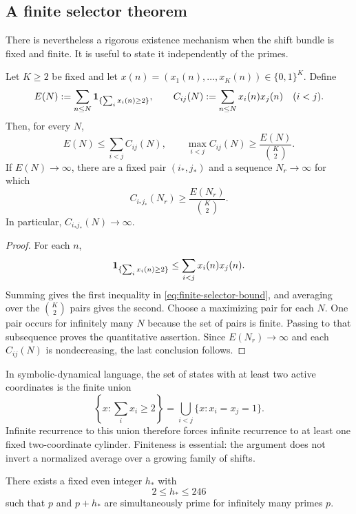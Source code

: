 \subsection{A finite selector theorem}

There is nevertheless a rigorous existence mechanism when the shift bundle
is fixed and finite.  It is useful to state it independently of the primes.

\begin{theorem}
\label{thm:finite-coactivation-selector}
Let $K\ge2$ be fixed and let
$x(n)=(x_1(n),\ldots,x_K(n))\in\{0,1\}^K$.  Define
\[
 E(N):=\sum_{n\le N}\mathbf 1_{\{\sum_i x_i(n)\ge2\}},
 \qquad
 C_{ij}(N):=\sum_{n\le N}x_i(n)x_j(n)
 \quad (i<j).
\]
Then, for every $N$,
\begin{equation}
 E(N)\le\sum_{i<j}C_{ij}(N),
 \qquad
 \max_{i<j}C_{ij}(N)\ge\frac{E(N)}{\binom K2}.
 \label{eq:finite-selector-bound}
\end{equation}
If $E(N)\to\infty$, there are a fixed pair $(i_*,j_*)$ and a sequence
$N_r\to\infty$ for which
\[
 C_{i_*j_*}(N_r)\ge \frac{E(N_r)}{\binom K2}.
\]
In particular, $C_{i_*j_*}(N)\to\infty$.
\end{theorem}

\begin{proof}
For each $n$,
\[
 \mathbf 1_{\{\sum_i x_i(n)\ge2\}}
 \le \sum_{i<j}x_i(n)x_j(n).
\]
Summing gives the first inequality in
\eqref{eq:finite-selector-bound}, and averaging over the $\binom K2$ pairs
gives the second.  Choose a maximizing pair for each $N$.  One pair occurs
for infinitely many $N$ because the set of pairs is finite.  Passing to
that subsequence proves the quantitative assertion.  Since $E(N_r)\to
\infty$ and each $C_{ij}(N)$ is nondecreasing, the last conclusion follows.
\end{proof}

In symbolic-dynamical language, the set of states with at least two active
coordinates is the finite union
\[
 \left\{x:\sum_i x_i\ge2\right\}
   =\bigcup_{i<j}\{x:x_i=x_j=1\}.
\]
Infinite recurrence to this union therefore forces infinite recurrence to
at least one fixed two-coordinate cylinder.  Finiteness is essential: the
argument does not invert a normalized average over a growing family of
shifts.

\begin{corollary}
\label{cor:unidentified-bounded-gap}
There exists a fixed even integer $h_*$ with
\[
 2\le h_*\le246
\]
such that $p$ and $p+h_*$ are simultaneously prime for infinitely many
primes $p$.
\end{corollary}

